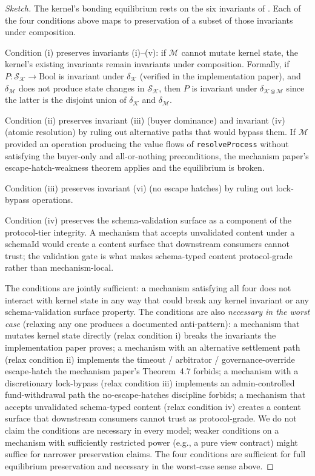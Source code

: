 \documentclass[11pt,a4paper]{article}
\theoremstyle{definition}
\theoremstyle{remark}
\begin{document}
\begin{proof}[Sketch]
The kernel's bonding equilibrium rests on the six invariants of
. Each of the four conditions above maps to
preservation of a subset of those invariants under composition.

Condition (i) preserves invariants (i)--(v): if
$\mathcal{M}$ cannot mutate kernel state, the kernel's existing
invariants remain invariants under composition. Formally, if
$P : \mathcal{S}_{\mathcal{K}} \to \mathrm{Bool}$ is invariant under
$\delta_{\mathcal{K}}$ (verified in the implementation paper), and
$\delta_{\mathcal{M}}$ does not produce state changes in
$\mathcal{S}_{\mathcal{K}}$, then $P$ is invariant under
$\delta_{\mathcal{K} \otimes \mathcal{M}}$ since the latter is the
disjoint union of $\delta_{\mathcal{K}}$ and $\delta_{\mathcal{M}}$.

Condition (ii) preserves invariant (iii) (buyer dominance) and
invariant (iv) (atomic resolution) by ruling out alternative paths
that would bypass them. If $\mathcal{M}$ provided an operation
producing the value flows of \texttt{resolveProcess} without
satisfying the buyer-only and all-or-nothing preconditions, the
mechanism paper's escape-hatch-weakness theorem applies and the
equilibrium is broken.

Condition (iii) preserves invariant (vi) (no escape hatches) by
ruling out lock-bypass operations.

Condition (iv) preserves the schema-validation surface as a
component of the protocol-tier integrity. A mechanism that accepts
unvalidated content under a schemaId would create a content surface
that downstream consumers cannot trust; the validation gate is
what makes schema-typed content protocol-grade rather than
mechanism-local.

The conditions are jointly sufficient: a mechanism satisfying all
four does not interact with kernel state in any way that could
break any kernel invariant or any schema-validation surface
property. The conditions are also \emph{necessary in the worst
case} (relaxing any one produces a documented anti-pattern): a
mechanism that mutates kernel state directly (relax condition i)
breaks the invariants the implementation paper proves; a
mechanism with an alternative settlement path (relax condition ii)
implements the timeout / arbitrator / governance-override
escape-hatch the mechanism paper's Theorem~4.7 forbids; a
mechanism with a discretionary lock-bypass (relax condition iii)
implements an admin-controlled fund-withdrawal path the
no-escape-hatches discipline forbids; a mechanism that accepts
unvalidated schema-typed content (relax condition iv) creates a
content surface that downstream consumers cannot trust as
protocol-grade. We do not claim the conditions are necessary in
every model; weaker conditions on a mechanism with sufficiently
restricted power (e.g., a pure view contract) might suffice for
narrower preservation claims. The four conditions are sufficient
for full equilibrium preservation and necessary in the
worst-case sense above.
\end{proof}
\end{document}
